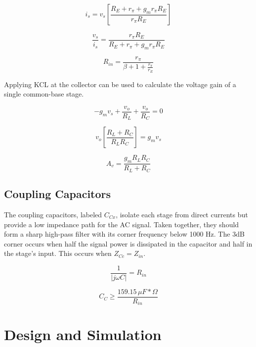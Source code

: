 \documentclass[titlepage, letterpaper, 11pt]{article}
\begin{document}
\begin{equation*}
i_{s}=v_{s} \left[
\frac{R_{E}+r_{\pi}+g_{m}r_{\pi}R_{E}}
{r_{\pi}R_{E}} \right]
\end{equation*}

\begin{equation*}
\frac{v_{s}}{i_{s}}
=\frac{r_{\pi}R_{E}}{R_{E}+r_{\pi}+g_{m}r_{\pi}R_{E}}
\end{equation*}

\begin{equation}
R_{in}=\frac{r_{\pi}}{\beta+1+\frac{r_{\pi}}{r_{E}}}
\label{commonBaseRin}
\end{equation}

Applying KCL at the collector can be used to calculate the voltage
gain of a single common-base stage.

\begin{equation*}
-g_{m}v_{s}+\frac{v_{o}}{R_{L}}+\frac{v_{o}}{R_{C}}=0
\end{equation*}

\begin{equation*}
v_{o}\left[\frac{R_{L}+R_{C}}{R_{L}R_{C}}\right]=g_{m}v_{s}
\end{equation*}

\begin{equation}
A_{v}=\frac{g_{m}R_{L}R_{C}}{R_{L}+R_{C}}
\end{equation}

\subsection{Coupling Capacitors}

The coupling capacitors, labeled $C_{Cx}$, isolate each stage from
direct currents but provide a low impedance path for the AC signal.
Taken together, they should form a sharp high-pass filter with its
corner frequency below 1000 Hz. The 3dB corner occurs when half the
signal power is dissipated in the capacitor and half in the stage's
input. This occurs when $Z_{Cc}=Z_{in}$.

\begin{equation*}
\frac{1}{|j\omega C|}=R_{in}
\end{equation*}

\begin{equation}
C_{C}\geq \frac{159.15\,\mu F*\Omega}{R_{in}}
\end{equation}

\section{Design and Simulation}
\end{document}
